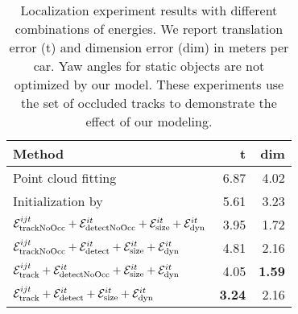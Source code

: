

\begin{table}
  \begin{tabular}{lrr}
    \toprule
    Method & t & dim \\
    \midrule
    Point cloud fitting
    & 6.87 & 4.02\\
    Initialization by~\cite{Song_Chandraker_2014}
    & 5.61 & 3.23\\
    $\mathcal{E}^{ijt}_{\text{trackNoOcc}} + \mathcal{E}^{it}_{\text{detectNoOcc}} +\mathcal{E}^{it}_{\text{size}}+\mathcal{E}^{it}_{\text{dyn}}$ 
    & 3.95  & 1.72\\        
    $\mathcal{E}^{ijt}_{\text{trackNoOcc}} + \mathcal{E}^{it}_{\text{detect}} +\mathcal{E}^{it}_{\text{size}}+\mathcal{E}^{it}_{\text{dyn}}$        
    & 4.81  & 2.16\\        
    $\mathcal{E}^{ijt}_{\text{track}} + \mathcal{E}^{it}_{\text{detectNoOcc}} +\mathcal{E}^{it}_{\text{size}}+\mathcal{E}^{it}_{\text{dyn}}$      
    & 4.05  & {\bf 1.59}\\        
    $\mathcal{E}^{ijt}_{\text{track}} + \mathcal{E}^{it}_{\text{detect}} +\mathcal{E}^{it}_{\text{size}}+\mathcal{E}^{it}_{\text{dyn}}$             
    & {\bf 3.24}  & 2.16\\
    \bottomrule
  \end{tabular}
  \caption{\small Localization experiment results with different combinations of energies. We report translation error (t) and dimension error (dim) in meters per car. Yaw angles for static objects are not optimized by our model. These experiments use the set of occluded tracks to demonstrate the effect of our modeling.}
  \label{tab:localizationExperiment}
\end{table}


